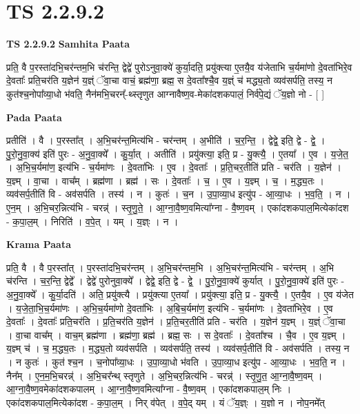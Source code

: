 \documentclass[17pt]{extarticle}
\begin{document}
\section{ TS 2.2.9.2 }

\textbf{TS 2.2.9.2 } \newline
\textbf{Samhita Paata} \newline

प्रति॒ वै प॒रस्ता॑दभि॒चर॑न्तम॒भि च॑रन्ति॒ द्वेद्वे॑ पुरोऽनुवा॒क्ये॑ कुर्या॒दति॒ प्रयु॑क्त्या ए॒तयै॒व य॑जेताभि च॒र्यमा॑णो दे॒वता॑भिरे॒व दे॒वताः᳚ प्रति॒चर॑ति य॒ज्ञेन॑ य॒ज्ञ्ं ॅवा॒चा वाचं॒ ब्रह्म॑णा॒ ब्रह्म॒ स दे॒वता᳚श्चै॒व य॒ज्ञ्ं च॑ मद्ध्य॒तो व्यव॑सर्पति॒ तस्य॒ न कुत॑श्च॒नोपा᳚व्या॒धो भ॑वति॒ नैन॑मभि॒चरन्᳚-थ्स्तृणुत आग्नावैष्ण॒व-मेका॑दशकपालं॒ निर्व॑पे॒द्यं ॅय॒ज्ञो नो - [  ] \newline

\textbf{Pada Paata} \newline

प्रतीति॑ । वै । प॒रस्ता᳚त् । अ॒भि॒चर॑न्त॒मित्य॑भि - चर॑न्तम् । अ॒भीति॑ । च॒र॒न्ति॒ । द्वेद्वे॒ इति॒ द्वे - द्वे॒ । पु॒रो॒नु॒वा॒क्य॑ इति॑ पुरः - अ॒नु॒वा॒क्ये᳚ । कु॒र्या॒त् । अतीति॑ । प्रयु॑क्त्या॒ इति॒ प्र - यु॒क्त्यै॒ । ए॒तया᳚ । ए॒व । य॒जे॒त॒ । अ॒भि॒च॒र्यमा॑ण॒ इत्य॑भि - च॒र्यमा॑णः । दे॒वता॑भिः । ए॒व । दे॒वताः᳚ । प्र॒ति॒चर॒तीति॑ प्रति - चर॑ति । य॒ज्ञेन॑ । य॒ज्ञ्म् । वा॒चा । वाच᳚म् । ब्रह्म॑णा । ब्रह्म॑ । सः । दे॒वताः᳚ । च॒ । ए॒व । य॒ज्ञ्म् । च॒ । म॒द्ध्य॒तः । व्यव॑सर्प॒तीति॑ वि - अव॑सर्पति । तस्य॑ । न । कुतः॑ । च॒न । उ॒पा॒व्या॒ध इत्यु॑प - आ॒व्या॒धः । भ॒व॒ति॒ । न । ए॒न॒म् । अ॒भि॒चर॒न्नित्य॑भि - चरन्न्॑ । स्तृ॒णु॒ते॒ । आ॒ग्ना॒वै॒ष्ण॒वमित्या᳚ग्ना - वै॒ष्ण॒वम् । एका॑दशकपाल॒मित्येका॑दश - क॒पा॒ल॒म् । निरिति॑ । व॒पे॒त् । यम् । य॒ज्ञ्ः । न ।  \newline


\textbf{Krama Paata} \newline

प्रति॒ वै । वै प॒रस्ता᳚त् । प॒रस्ता॑दभि॒चर॑न्तम् । अ॒भि॒चर॑न्तम॒भि । अ॒भि॒चर॑न्त॒मित्य॑भि - चर॑न्तम् । अ॒भि च॑रन्ति । च॒र॒न्ति॒ द्वेद्वे᳚ । द्वेद्वे॑ पुरोनुवा॒क्ये᳚ । द्वेद्वे॒ इति॒ द्वे - द्वे॒ । पु॒रो॒नु॒वा॒क्ये॑ कुर्यात् । पु॒रो॒नु॒वा॒क्ये॑ इति॑ पुरः - अ॒नु॒वा॒क्ये᳚ । कु॒र्या॒दति॑ । अति॒ प्रयु॑क्त्यै । प्रयु॑क्त्या ए॒तया᳚ । प्रयु॑क्त्या॒ इति॒ प्र - यु॒क्त्यै॒ । ए॒तयै॒व । ए॒व य॑जेत । य॒जे॒ता॒भि॒च॒र्यमा॑णः । अ॒भि॒च॒र्यमा॑णो दे॒वता॑भिः । अ॒बि॒च॒र्यमा॑ण॒ इत्य॑भि - च॒र्यमा॑णः । दे॒वता॑भिरे॒व । ए॒व दे॒वताः᳚ । दे॒वताः᳚ प्रति॒चर॑ति । प्र॒ति॒चर॑ति य॒ज्ञेन॑ । प्र॒ति॒चर॒तीति॑ प्रति - चर॑ति । य॒ज्ञेन॑ य॒ज्ञ्म् । य॒ज्ञ्ं ॅवा॒चा । वा॒चा वाच᳚म् । वाच॒म् ब्रह्म॑णा । ब्रह्म॑णा॒ ब्रह्म॑ । ब्रह्म॒ सः । स दे॒वताः᳚ । दे॒वता᳚श्च । चै॒व । ए॒व य॒ज्ञ्म् । य॒ज्ञ्म् च॑ । च॒ म॒द्ध्य॒तः । म॒द्ध्य॒तो व्यव॑सर्पति । व्यव॑सर्पति॒ तस्य॑ । व्यव॑सर्प॒तीति॑ वि - अव॑सर्पति । तस्य॒ न । न कुतः॑ । कुत॑ श्च॒न । च॒नोपा᳚व्या॒धः । उ॒पा॒व्या॒धो भ॑वति । उ॒पा॒व्या॒ध इत्यु॑प - आ॒व्या॒धः । भ॒व॒ति॒ न । नैन᳚म् । ए॒न॒म॒भि॒चरन्न्॑ । अ॒भि॒चर᳚न्थ् स्तृणुते । अ॒भि॒चर॒न्नित्य॑भि - चरन्न्॑ । स्तृ॒णु॒त॒ आ॒ग्ना॒वै॒ष्ण॒वम् । आ॒ग्ना॒वै॒ष्ण॒वमेका॑दशकपालम् । आ॒ग्ना॒वै॒ष्ण॒वमित्या᳚ग्ना - वै॒ष्ण॒वम् । एका॑दशकपाल॒म् निः । एका॑दशकपाल॒मित्येका॑दश - क॒पा॒ल॒म् । निर् व॑पेत् । व॒पे॒द् यम् । यं ॅय॒ज्ञ्ः । य॒ज्ञो न । 
नोप॒नमे᳚त् \newline
\end{document}
